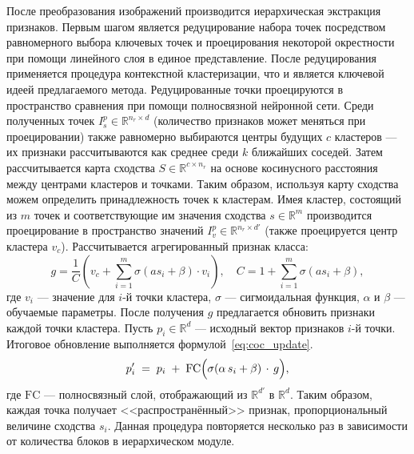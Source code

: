 После преобразования изображений производится иерархическая экстракция признаков. Первым шагом
является редуцирование набора точек посредством равномерного выбора ключевых точек и
проецирования некоторой окрестности при помощи линейного слоя в единое представление.
После редуцирования применяется процедура контекстной кластеризации, что и является ключевой
идеей предлагаемого метода. Редуцированные точки проецируются в пространство сравнения при помощи
полносвязной нейронной сети. Среди полученных точек $I^p_s \in \mathbb{R}^{n_r \times d}$
(количество признаков может меняться при проецировании) также равномерно выбираются
центры будущих $c$ кластеров --- их признаки рассчитываются как среднее среди $k$ ближайших соседей.
Затем рассчитывается карта сходства $S \in \mathbb{R}^{c\times n_r}$ на основе
косинусного расстояния между центрами кластеров и точками. Таким образом,
используя карту сходства можем определить принадлежность точек к кластерам.
Имея кластер, состоящий из $m$ точек и соответствующие им значения сходства $s \in \mathbb{R}^m$
производится проецирование в пространство значений $I^p_v \in \mathbb{R}^{n_r\times d'}$ (также проецируется центр кластера $v_c$).
Рассчитывается агрегированный признак класса:
\begin{equation*}
  g = \frac{1}{C} \left( v_c + \sum_{i=1}^m \sigma(a s_i + \beta) \cdot v_i \right), \quad  C = 1 + \sum_{i=1}^m \sigma(a s_i + \beta),
\end{equation*}
где $v_i$ --- значение для $i$-й точки кластера, $\sigma$ --- сигмоидальная функция, $\alpha$ и $\beta$ --- обучаемые параметры.
После получения $g$ предлагается обновить признаки каждой точки кластера. Пусть $p_i \in \mathbb{R}^{d}$ ---
исходный вектор признаков $i$-й точки. Итоговое обновление выполняется формулой~\eqref{eq:coc_update}.
\begin{equation}
  \label{eq:coc_update}
  p'_i \;=\; p_i \;+\;
  \mathrm{FC}\Bigl(\sigma(\alpha\, s_i + \beta)\,\cdot\, g\Bigr),
\end{equation}
где $\mathrm{FC}$ --- полносвязный слой, отображающий из $\mathbb{R}^{d'}$ в $\mathbb{R}^{d}$.
Таким образом, каждая точка получает <<распространённый>> признак, пропорциональный величине сходства $s_i$.
Данная процедура повторяется несколько раз в зависимости от количества блоков в иерархическом
модуле.